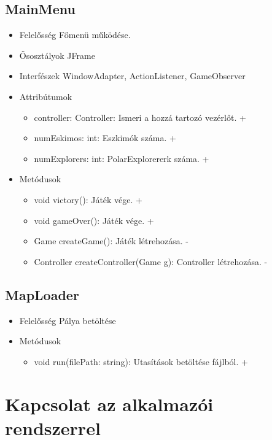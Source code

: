 \subsection{MainMenu}
\begin{itemize}
	\item Felelősség\newline
	Főmenü működése.
	\item Ősosztályok\newline
	JFrame
	\item Interfészek\newline
	WindowAdapter, ActionListener, GameObserver
	\item Attribútumok\newline
	\begin{itemize}
		\item controller: Controller: Ismeri a hozzá tartozó vezérlőt. +	
		\item numEskimos: int: Eszkimók száma. +
		\item numExplorers: int: PolarExplorererk száma. +	
	\end{itemize}
	\item Metódusok\newline
	\begin{itemize}
		\item void victory(): Játék vége. +
		\item void gameOver(): Játék vége. +
		\item Game createGame(): Játék létrehozása. -
		\item Controller createController(Game g): Controller létrehozása. -
	\end{itemize}
\end{itemize}

\subsection{MapLoader}
\begin{itemize}
\item Felelősség\newline
Pálya betöltése
\item Metódusok\newline
	\begin{itemize}
		\item void run(filePath: string): Utasítások betöltése fájlból. +
	\end{itemize}
\end{itemize}

\section{Kapcsolat az alkalmazói rendszerrel}

